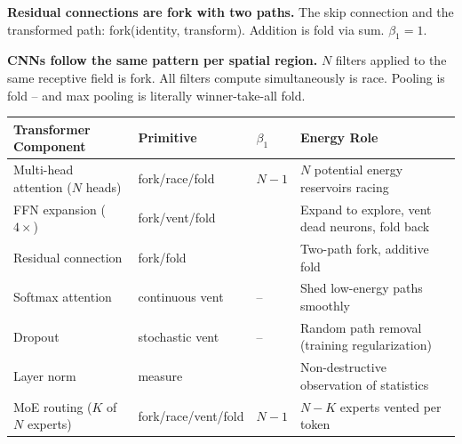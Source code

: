\documentclass[
  11pt,
]{article}
\newcounter{none} %
\begin{document}
\textbf{Residual connections are fork with two paths.} The skip
connection and the transformed path: fork(identity, transform). Addition
is fold via sum. \(\beta_1 = 1\).

\textbf{CNNs follow the same pattern per spatial region.} \(N\) filters
applied to the same receptive field is fork. All filters compute
simultaneously is race. Pooling is fold -- and max pooling is literally
winner-take-all fold.

{\def\LTcaptype{none} %
\begin{longtable}[]{@{}
  >{\raggedright\arraybackslash}p{}
  >{\raggedright\arraybackslash}p{}
  >{\raggedright\arraybackslash}p{}
  >{\raggedright\arraybackslash}p{}@{}}
\toprule\noalign{}
\begin{minipage}[b]{\linewidth}\raggedright
Transformer Component
\end{minipage} & \begin{minipage}[b]{\linewidth}\raggedright
Primitive
\end{minipage} & \begin{minipage}[b]{\linewidth}\raggedright
\(\beta_1\)
\end{minipage} & \begin{minipage}[b]{\linewidth}\raggedright
Energy Role
\end{minipage} \\
\midrule\noalign{}
\endhead
\bottomrule\noalign{}
\endlastfoot
Multi-head attention (\(N\) heads) & fork/race/fold & \(N - 1\) & \(N\)
potential energy reservoirs racing \\
FFN expansion (\(4\times\)) & fork/vent/fold & 3 & Expand to explore,
vent dead neurons, fold back \\
Residual connection & fork/fold & 1 & Two-path fork, additive fold \\
Softmax attention & continuous vent & -- & Shed low-energy paths
smoothly \\
Dropout & stochastic vent & -- & Random path removal (training
regularization) \\
Layer norm & measure & 0 & Non-destructive observation of statistics \\
MoE routing (\(K\) of \(N\) experts) & fork/race/vent/fold & \(N - 1\) &
\(N - K\) experts vented per token \\
\end{longtable}
}
\end{document}
